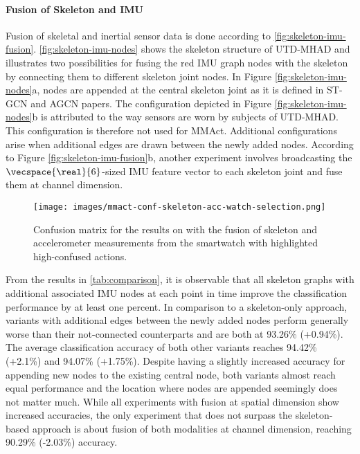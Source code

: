 \paragraph{Fusion of Skeleton and IMU}

Fusion of skeletal and inertial sensor data is done according to \figname\ref{fig:skeleton-imu-fusion}. \figname\ref{fig:skeleton-imu-nodes} shows the skeleton structure of UTD-MHAD and illustrates two possibilities for fusing the red IMU graph nodes with the skeleton by connecting them to different skeleton joint nodes. In Figure \ref{fig:skeleton-imu-nodes}a, nodes are appended at the central skeleton joint as it is defined in ST-GCN and AGCN papers. The configuration depicted in Figure \ref{fig:skeleton-imu-nodes}b is attributed to the way sensors are worn by subjects of UTD-MHAD. This configuration is therefore not used for MMAct. 
Additional configurations arise when additional edges are drawn between the newly added nodes. According to Figure \ref{fig:skeleton-imu-fusion}b, another experiment involves broadcasting the $\vecspace{\real}{6}$-sized IMU feature vector to each skeleton joint and fuse them at channel dimension.
\begin{wrapfigure}[13]{r}{0.5\textwidth}
    \centering
    \texttt{[image: images/mmact-conf-skeleton-acc-watch-selection.png]}
    \caption{Confusion matrix for the results on \mmact{} with the fusion of skeleton and accelerometer measurements from the smartwatch with highlighted high-confused actions.}
    \label{fig:mmact_confusion}
\end{wrapfigure}
From the results in \tabname\ref{tab:comparison}, it is observable that all skeleton graphs with additional associated IMU nodes at each point in time improve the classification performance by at least one percent. In comparison to a skeleton-only approach, variants with additional edges between the newly added nodes perform generally worse than their not-connected counterparts and are both at 93.26\% (+0.94\%). The average classification accuracy of both other variants reaches 94.42\% (+2.1\%) and 94.07\% (+1.75\%). Despite having a slightly increased accuracy for appending new nodes to the existing central node, both variants almost reach equal performance and the location where nodes are appended seemingly does not matter much. While all experiments with fusion at spatial dimension show increased accuracies, the only experiment that does not surpass the skeleton-based approach is about fusion of both modalities at channel dimension, reaching 90.29\% (-2.03\%) accuracy.

